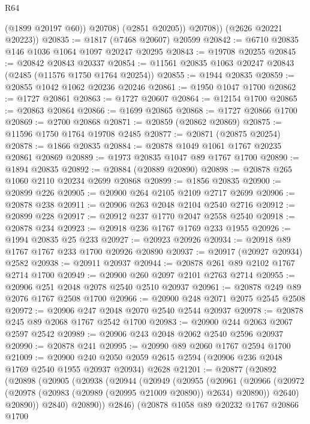 \begin{lexlean}{R64}
\begin{coremodule}
                (@1899 @20197 @60))
              @20708)
            (@2851 @20205))
          @20708))
      (@2626 @20221 @20223))
@20835 := @1817 (@7468 @20607) @20599
@20842 := @6710 @20835 @146 @1036 @1064 @1097 @20247 @20295
@20843 := @19708 @20255
@20845 := @20842 @20843 @20337
@20854 := @11561 @20835 @1063 @20247 @20843 (@2485 (@11576 @1750 @1764 @20254))
@20855 := @1944 @20835
@20859 := @20855 @1042 @1062 @20236 @20246
@20861 := @1950 @1047 @1700
@20862 := @1727 @20861
@20863 := @1727 @20607
@20864 := @12154 @1700
@20865 := @20863 @20864
@20866 := @1699 @20865
@20868 := @1727 @20866 @1700
@20869 := @2700 @20868
@20871 := @20859 (@20862 @20869)
@20875 := @11596 @1750 @1764 @19708 @2485
@20877 := @20871 (@20875 @20254)
@20878 := @1866 @20835
@20884 := @20878 @1049 @1061 @1767 @20235 @20861 @20869
@20889 := @1973 @20835 @1047 @89 @1767 @1700
@20890 := @1894 @20835
@20892 := @20884 (@20889 @20890)
@20898 := @20878 @265 @1060 @2110 @20234 @2699 @20868
@20899 := @1856 @20835
@20900 := @20899 @226
@20905 := @20900 @264 @2105 @2109 @2717 @2699
@20906 := @20878 @238
@20911 := @20906 @263 @2048 @2104 @2540 @2716
@20912 := @20899 @228
@20917 := @20912 @237 @1770 @2047 @2558 @2540
@20918 := @20878 @234
@20923 := @20918 @236 @1767 @1769 @233 @1955
@20926 := @1994 @20835 @25 @233
@20927 := @20923 @20926
@20934 := @20918 @89 @1767 @1767 @233 @1700 @20926 @20890
@20937 := @20917 (@20927 @20934) @2582
@20938 := @20911 @20937
@20944 := @20878 @261 @89 @2102 @1767 @2714 @1700
@20949 := @20900 @260 @2097 @2101 @2763 @2714
@20955 := @20906 @251 @2048 @2078 @2540 @2510 @20937
@20961 := @20878 @249 @89 @2076 @1767 @2508 @1700
@20966 := @20900 @248 @2071 @2075 @2545 @2508
@20972 := @20906 @247 @2048 @2070 @2540 @2544 @20937
@20978 := @20878 @245 @89 @2068 @1767 @2542 @1700
@20983 := @20900 @244 @2063 @2067 @2597 @2542
@20989 := @20906 @243 @2048 @2062 @2540 @2596 @20937
@20990 := @20878 @241
@20995 := @20990 @89 @2060 @1767 @2594 @1700
@21009 := @20900
    @240
    @2050
    @2059
    @2615
    @2594
    (@20906 @236 @2048 @1769 @2540 @1955 @20937 @20934)
    @2628
@21201 := @20877
    (@20892
      (@20898
        (@20905
          (@20938
            (@20944
              (@20949
                (@20955
                  (@20961
                    (@20966
                      (@20972 (@20978 (@20983 (@20989 (@20995 @21009 @20890)) @2634) @20890))
                      @2640)
                    @20890))
                @2840)
              @20890))
          @2846)
        (@20878
          @1058
          @89
          @20232
          @1767
          @20866
          @1700

\end{coremodule}
\end{lexlean}

